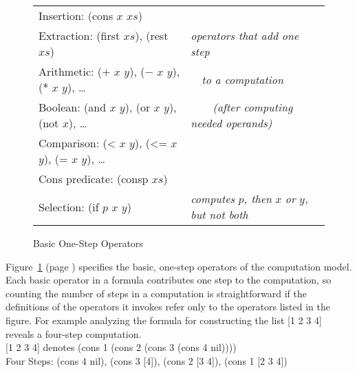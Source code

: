 \begin{figure}
\begin{center}
\begin{spacing}{0.9}
\begin{tabular}{ll}
Insertion: \textsf{(cons $x$ $xs$)}                                       & \\
Extraction: \textsf{(first $xs$)}, \textsf{(rest $xs$)}                            & \emph{operators that add one step}           \\
Arithmetic: \textsf{($+$ $x$ $y$)}, \textsf{($-$ $x$ $y$)}, \textsf{($*$ $x$ $y$)}, \dots   & ~~\emph{to a computation}                    \\
Boolean: \textsf{(and $x$ $y$)}, \textsf{(or $x$ $y$)}, \textsf{(not $x$)}, \dots       & ~~~~\emph{(after computing needed operands)} \\
Comparison: \textsf{(< $x$ $y$)}, \textsf{(<= $x$ $y$)}, \textsf{(= $x$ $y$)}, \dots  & \\
Cons predicate: \textsf{(consp $xs$)}                                     & \\
Selection: \textsf{(if $p$ $x$ $y$)}                                      & \emph{computes} $p$\emph{, then} $x$ \emph{or} $y$\emph{, but not both}
\end{tabular}
\end{spacing}
\end{center}
\caption{Basic One-Step Operators}
\label{fig:basic-one-step-ops}
\end{figure}

Figure~\ref{fig:basic-one-step-ops} (page \pageref{fig:basic-one-step-ops})
specifies the basic, one-step operators of
the computation model.
Each basic operator in a formula contributes one step
to the computation, so
counting the number of steps in a computation is straightforward
if the definitions of the operators it invokes refer only
to the operators listed in the figure.
For example analyzing the formula for constructing
the list \textsf{[1 2 3 4]} reveals a four-step computation.\vspace{2mm}\\
\hspace*{1cm}\textsf{[1 2 3 4]} denotes \textsf{(cons 1 (cons 2 (cons 3 (cons 4 nil))))}\\
\hspace*{1cm}Four Steps: \textsf{(cons 4 nil)}, \textsf{(cons 3 [4])}, \textsf{(cons 2 [3 4])}, \textsf{(cons 1 [2 3 4])}\vspace{2mm}

